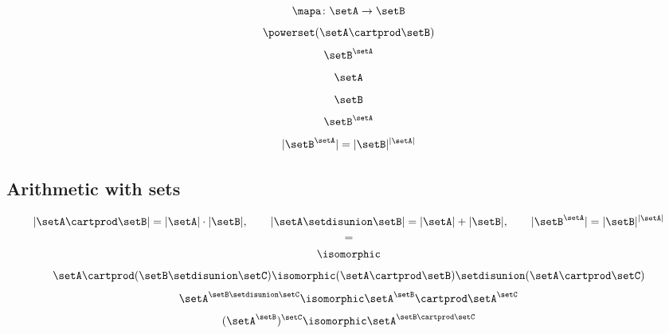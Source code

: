 \begin{forslides}
    \begin{equation}
        \label{eq:slides_session2_156}
        \mapa \colon \setA \to \setB
    \end{equation}
    \begin{equation}
        \label{eq:slides_session2_157}
        \powerset (\setA \cartprod \setB)
    \end{equation}
    \begin{equation}
        \label{eq:slides_session2_158}
        \setB^{\setA}
    \end{equation}
    \begin{equation}
        \label{eq:slides_session2_159}
        \setA
    \end{equation}
    \begin{equation}
        \label{eq:slides_session2_160}
        \setB
    \end{equation}
    \begin{equation}
        \label{eq:slides_session2_161}
        \setB^{\setA}
    \end{equation}
    \begin{equation}
        \label{eq:slides_session2_162}
        \vert \setB^{\setA} \vert = \vert \setB \vert^{\vert \setA \vert}
    \end{equation}

    \subsection{Arithmetic with sets}

    \begin{equation}
        \label{eq:slides_session2_163}
        \vert \setA \cartprod \setB \vert = \vert \setA \vert \cdot \vert \setB \vert, \qquad \vert \setA \setdisunion \setB \vert = \vert \setA \vert + \vert \setB \vert, \qquad \vert \setB^{\setA} \vert = \vert \setB \vert^{\vert \setA \vert}
    \end{equation}
    \begin{equation}
        \label{eq:slides_session2_164}
        =
    \end{equation}
    \begin{equation}
        \label{eq:slides_session2_165}
        \isomorphic
    \end{equation}
    \begin{equation}
        \label{eq:slides_session2_166}
        \setA \cartprod (\setB \setdisunion \setC)  \isomorphic (\setA \cartprod \setB) \setdisunion (\setA \cartprod \setC)
    \end{equation}
    \begin{equation}
        \label{eq:slides_session2_167}
        \setA^{\setB \setdisunion \setC} \isomorphic \setA^\setB \cartprod \setA^\setC
    \end{equation}
    \begin{equation}
        \label{eq:slides_session2_168}
        (\setA^\setB)^\setC  \isomorphic \setA^{\setB \cartprod \setC}
    \end{equation}


\end{forslides}
